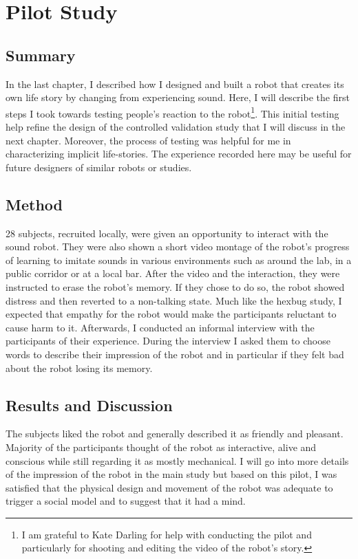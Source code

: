 \chapter{Pilot Study}
\label{chap_pilot}

\section{Summary}

In the last chapter, I described how I designed and built a robot that creates its own life story by changing from experiencing sound. Here, I will describe the first steps I took towards testing people's reaction to the robot\footnote{I am grateful to Kate Darling for help with conducting the pilot and particularly for shooting and editing the video of the robot's story.}. This initial testing help refine the design of the controlled validation study that I will discuss in the next chapter. Moreover, the process of testing was helpful for me in characterizing implicit life-stories. The experience recorded here may be useful for future designers of similar robots or studies. 

\section{Method}

28 subjects, recruited locally, were given an opportunity to interact with the sound robot. They were also shown a short video montage of the robot's progress of learning to imitate sounds in various environments such as around the lab, in a public corridor or at a local bar. After the video and the interaction, they were instructed to erase the robot's memory. If they chose to do so, the robot showed distress and then reverted to a non-talking state. Much like the hexbug study, I expected that empathy for the robot would make the participants reluctant to cause harm to it. Afterwards, I conducted an informal interview with the participants of their experience. During the interview I asked them to choose words to describe their impression of the robot and in particular if they felt bad about the robot losing its memory. 

\section{Results and Discussion}

The subjects liked the robot and generally described it as friendly and pleasant. Majority of the participants thought of the robot as interactive, alive and conscious while still regarding it as mostly mechanical.  I will go into more details of the impression of the robot in the main study but based on this pilot, I was satisfied that the physical design and movement of the robot was adequate to trigger a social model and to suggest that it had a mind. 

